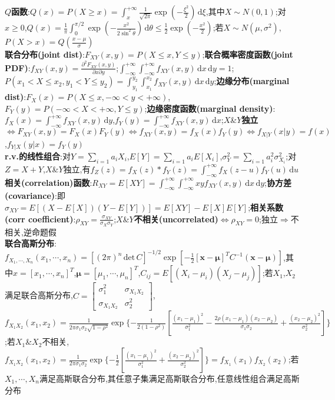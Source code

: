 \documentclass[UTF8,a4paper,10pt]{article}
\providecommand{\det}{\,\text{det}\,}
\begin{document}
\begin{multicols}{2}
    \textbf{$Q$函数}:$Q(x)=P(X\geq x)=\int_x^{+\infty}\frac{1}{\sqrt{2\pi}}\exp(-\frac{\xi^2}{2})\,\mathrm{d}\xi$,其中$X\sim N(0,1)$;对$x\geq 0$,$Q(x)=\frac{1}{\pi}\int_0^{\pi/2}\exp(-\frac{x^2}{2\sin^2\theta})\,\mathrm{d}\theta\leq\frac{1}{2}\exp(-\frac{x^2}{2})$;若$X\sim N(\mu,\sigma^2)$,$P(X>x)=Q(\frac{x-\mu}{\sigma})$\\
    \textbf{联合分布(joint dist)}:$F_{XY}(x,y)=P(X\leq x,Y\leq y)$;\textbf{联合概率密度函数(joint PDF)}:$f_{XY}(x,y)=\frac{\partial^2F_{XY}(x,y)}{\partial x\partial y}$;$\int_{-\infty}^{+\infty}\int_{-\infty}^{+\infty}f_{XY}(x,y)\,\mathrm{d}x\,\mathrm{d}y=1$;$P(x_1<X\leq x_2,y_1<Y\leq y_2)=\int_{y_1}^{y_2}\int_{x_1}^{x_2}f_{XY}(x,y)\,\mathrm{d}x\,\mathrm{d}y$;\textbf{边缘分布(marginal dist)}:$F_X(x)=P(X\leq x,-\infty<y<+\infty)$,$F_Y(y)=P(-\infty<X<+\infty,Y\leq y)$;\textbf{边缘密度函数(marginal density)}:$f_X(x)=\int_{-\infty}^{+\infty}f_{XY}(x,y)\,\mathrm{d}y$,$f_Y(y)=\int_{-\infty}^{+\infty}f_{XY}(x,y)\,\mathrm{d}x$;$X$\&$Y$\textbf{独立}$\Leftrightarrow F_{XY}(x,y)=F_X(x)F_Y(y)\Leftrightarrow f_{XY}(x,y)=f_X(x)f_Y(y)\Leftrightarrow f_{X\vert Y}(x\vert y)=f(x)$,$f_{Y\vert X}(y\vert x)=f_Y(y)$\\
    \textbf{r.v.的线性组合}:对$Y=\sum_{i=1}a_iX_i$,$E[Y]=\sum_{i=1}a_iE[X_i]$,$\sigma_Y^2=\sum_{i=1}a_i^2\sigma_{X_i}^2$;对$Z=X+Y$,$X$\&$Y$独立,有$f_Z(z)=f_X(z)*f_Y(z)=\int_{-\infty}^{+\infty}f_X(z-u)f_Y(u)\,\mathrm{d}u$\\
    \textbf{相关(correlation)函数}:$R_{XY}=E[XY]=\int_{-\infty}^{+\infty}\int_{-\infty}^{+\infty}xyf_{XY}(x,y)\,\mathrm{d}x\,\mathrm{d}y$;\textbf{协方差(covariance)}:即$\sigma_{XY}=E[(X-E[X])(Y-E[Y])]=E[XY]-E[X]E[Y]$;\textbf{相关系数(corr coefficient)}:$\rho_{XY}=\frac{\sigma_{XY}}{\sigma_X\sigma_Y}$;$X$\&$Y$\textbf{不相关(uncorrelated)}$\Leftrightarrow\rho_{XY}=0$;独立$\Rightarrow$不相关,逆命题假\\
    \textbf{联合高斯分布}:$f_{X_1,\cdots,X_n}(x_1,\cdots,x_n)=[(2\pi)^n\det C]^{-1/2}\exp[-\frac{1}{2}[\bm{x}-\bm{\mu}]^TC^{-1}(\bm{x}-\bm{\mu})]$,其中$x=[x_1,\cdots,x_n]^T$,$\bm{\mu}=[\mu_1,\cdots,\mu_n]^T$,$C_{ij}=E[(X_i-\mu_i)(X_j-\mu_j)]$;若$X_1$,$X_2$满足联合高斯分布,$C=\left[\begin{smallmatrix}
        \sigma_1^2&\sigma_{X_1X_2}\\
        \sigma_{X_1X_2}&\sigma_2^2
    \end{smallmatrix}\right]$,$f_{X_1X_2}(x_1,x_2)=\frac{1}{2\pi\sigma_1\sigma_2\sqrt{1-\rho^2}}\exp\{-\frac{1}{2(1-\rho^2)}[\frac{(x_1-\mu_1)^2}{\sigma_1^2}-\frac{2\rho(x_1-\mu_1)(x_2-\mu_2)}{\sigma_1\sigma_2}+\frac{(x_2-\mu_2)^2}{\sigma_2^2}]\}$;若$X_1$\&$X_2$不相关,$f_{X_1X_2}(x_1,x_2)=\frac{1}{2\pi\sigma_1\sigma_2}\exp\{-\frac{1}{2}[\frac{(x_1-\mu_1)^2}{\sigma_1^2}+\frac{(x_2-\mu_2)^2}{\sigma_2^2}]\}=f_{X_1}(x_1)f_{X_2}(x_2)$;若$X_1,\cdots,X_n$满足高斯联合分布,其任意子集满足高斯联合分布,任意线性组合满足高斯分布\\

\end{multicols}
\end{document}
